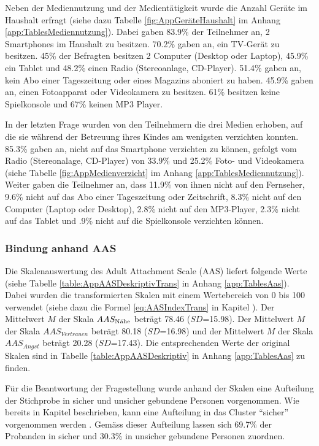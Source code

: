 Neben der Mediennutzung und der Medientätigkeit wurde die Anzahl Geräte im Haushalt erfragt (siehe dazu Tabelle \ref{fig:AppGeräteHaushalt} im Anhang \ref{app:TablesMediennutzung}). Dabei gaben 83.9\% der Teilnehmer an, 2 Smartphones im Haushalt zu besitzen. 70.2\% gaben an, ein TV-Gerät zu besitzen. 45\% der Befragten besitzen 2 Computer (Desktop oder Laptop), 45.9\% ein Tablet und 48.2\% einen Radio (Stereoanlage, CD-Player). 51.4\% gaben an, kein Abo einer Tageszeitung oder eines Magazins aboniert zu haben. 45.9\% gaben an, einen Fotoapparat oder Videokamera zu besitzen. 61\% besitzen keine Spielkonsole und 67\% keinen MP3 Player.

In der letzten Frage wurden von den Teilnehmern die drei Medien erhoben, auf die sie während der Betreuung ihres Kindes am wenigsten verzichten konnten. 85.3\% gaben an, nicht auf das Smartphone verzichten zu können, gefolgt vom Radio (Stereonalage, CD-Player) von 33.9\% und 25.2\% Foto- und Videokamera (siehe Tabelle \ref{fig:AppMedienverzicht} im Anhang \ref{app:TablesMediennutzung}). Weiter gaben die Teilnehmer an, dass 11.9\% von ihnen nicht auf den Fernseher, 9.6\% nicht auf das Abo einer Tageszeitung oder Zeitschrift, 8.3\% nicht auf den Computer (Laptop oder Desktop), 2.8\% nicht auf den MP3-Player, 2.3\% nicht auf das Tablet und .9\% nicht auf die Spielkonsole verzichten können.

\subsubsection{Bindung anhand AAS}
Die Skalenauswertung des Adult Attachment Scale (AAS) liefert folgende Werte (siehe Tabelle \ref{table:AppAASDeskriptivTrans} in Anhang \ref{app:TablesAas}). Dabei wurden die transformierten Skalen mit einem Wertebereich von 0 bis 100 verwendet (siehe dazu die Formel \ref{eq:AASIndexTrans} in Kapitel ). Der Mittelwert $M$ der Skala $AAS_{\textnormal{Nähe}}$ beträgt 78.46 ($SD$=15.98). Der Mittelwert $M$ der Skala $AAS_{Vertrauen}$ beträgt 80.18 ($SD$=16.98) und der Mittelwert  $M$ der Skala $AAS_{Angst}$ beträgt 20.28 ($SD$=17.43). Die entsprechenden Werte der original Skalen sind in Tabelle \ref{table:AppAASDeskriptiv} in Anhang \ref{app:TablesAas} zu finden.

Für die Beantwortung der Fragestellung wurde anhand der Skalen eine Aufteilung der Stichprobe in sicher und unsicher gebundene Personen vorgenommen. Wie bereits in Kapitel  beschrieben, kann eine Aufteilung in das Cluster \enquote{sicher} vorgenommen werden \cite{Schuetzmann2004}. Gemäss dieser Aufteilung lassen sich 69.7\% der Probanden in sicher und 30.3\% in unsicher gebundene Personen zuordnen. 

